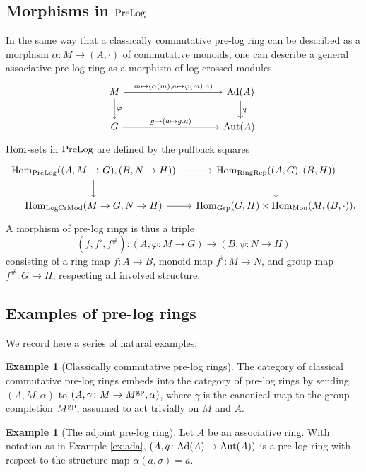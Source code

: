 \documentclass[a4paper,10pt%
]{amsart}
\numberwithin{equation}{section}
\theoremstyle{definition}
\newtheorem{example}[subsection]{Example}
\renewcommand{\:}{\colon}
\begin{document}
\subsection{Morphisms in ${\rm PreLog}$} In the same way that a classically commutative pre-log ring can be described as a morphism $\alpha \colon M \to (A, \cdot)$ of commutative monoids, one can describe a general associative pre-log ring as a morphism of log crossed modules \[\begin{tikzcd}M \ar{rrrr}{m \mapsto(\alpha(m), a \mapsto \varphi(m).a)} \ar{d}{\varphi} & & & & {\rm Ad}(A) \ar{d}{q} \\ G  \ar{rrrr}{g \mapsto (a \mapsto g.a)} & & & & {\rm Aut}(A).\end{tikzcd}\] ${\rm Hom}$-sets in ${\rm PreLog}$ are defined by the pullback squares \[\begin{tikzcd}[column sep = small]{\rm Hom}_{\rm PreLog}((A, M \to G), (B, N \to H)) \ar{r} \ar{d} & {\rm Hom}_{{\rm RingRep}}((A, G), (B, H)) \ar{d} \\ {\rm Hom}_{\rm LogCrMod}(M \to G, N \to H) \ar{r} & {\rm Hom}_{{\rm Grp}}(G, H) \times {\rm Hom}_{\rm Mon}(M, (B, \cdot)).\end{tikzcd}\] A morphism of pre-log rings is thus a triple \[(f, f^\flat, f^\#) \colon (A, \varphi \colon M \to G) \to (B, \psi \colon N \to H)\] consisting of a ring map $f \colon A \to B$, monoid map $f^\flat \colon M \to N$, and group map $f^\# \colon G \to H$, respecting all involved structure. 

\subsection{Examples of pre-log rings}\label{subsec:exprelog} We record here a series of natural examples: 

\begin{example}[Classically commutative pre-log rings] The category of classical commutative pre-log rings embeds into the category of pre-log rings by sending $(A, M, \alpha)$ to $(A, \gamma \colon M \to M^{\rm gp}, \alpha)$, where $\gamma$ is the canonical map to the group completion $M^{\rm gp}$, assumed to act trivially on $M$ and $A$.
\end{example}

\begin{example}[The adjoint pre-log ring]\label{ex:adaprelog} Let $A$ be an associative ring. With notation as in Example \ref{ex:ada}, $(A, q \colon {\rm Ad}(A) \to {\rm Aut}(A))$ is a pre-log ring with respect to the structure map $\alpha(a, \sigma) = a$. 
\end{example}
\end{document}
